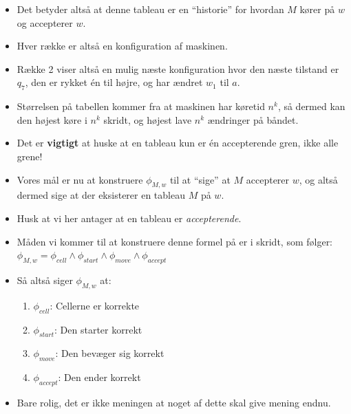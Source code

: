 \begin{frame}[allowframebreaks]
	\begin{itemize}
		\item Det betyder altså at denne tableau er en ``historie'' for hvordan $M$ kører på $w$ og accepterer $w$.
		\item Hver række er altså en konfiguration af maskinen.
		\item Række 2 viser altså en mulig næste konfiguration hvor den næste tilstand er $q_{7}$, den er rykket én til højre, og har ændret $w_{1}$ til $a$.
		\item Størrelsen på tabellen kommer fra at maskinen har køretid $n^{k}$, så dermed kan den højest køre i $n^{k}$ skridt, og højest lave $n^{k}$ ændringer på båndet.
		\item Det er \textbf{vigtigt} at huske at en tableau kun er én accepterende gren, ikke alle grene!
		\item Vores mål er nu at konstruere \(\phi_{M,w}\) til at ``sige'' at $M$ accepterer $w$, og altså dermed sige at der eksisterer en tableau $M$ på $w$.
		\item Husk at vi her antager at en tableau er \textit{accepterende}.
		\item Måden vi kommer til at konstruere denne formel på er i skridt, som følger: \(\phi_{M,w} = \phi_{cell} \land \phi_{start} \land \phi_{move} \land \phi_{accept}\)
		\item Så altså siger \(\phi_{M,w}\) at:
		      \begin{enumerate}
			      \item \(\phi_{cell}\): Cellerne er korrekte
			      \item \(\phi_{start}\): Den starter korrekt
			      \item \(\phi_{move}\): Den bevæger sig korrekt
			      \item \(\phi_{accept}\): Den ender korrekt
		      \end{enumerate}
		\item Bare rolig, det er ikke meningen at noget af dette skal give mening endnu.
	\end{itemize}
\end{frame}

